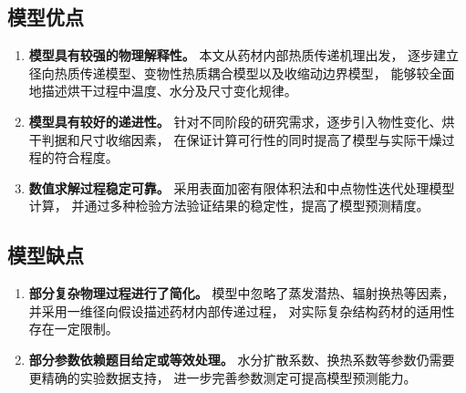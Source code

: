 \subsection{模型优点}

\begin{enumerate}[label=\arabic*、,leftmargin=2em,labelsep=0pt,itemsep=0.5em,topsep=0.3em]
\item \textbf{模型具有较强的物理解释性。}
本文从药材内部热质传递机理出发，
逐步建立径向热质传递模型、变物性热质耦合模型以及收缩动边界模型，
能够较全面地描述烘干过程中温度、水分及尺寸变化规律。

\item \textbf{模型具有较好的递进性。}
针对不同阶段的研究需求，逐步引入物性变化、烘干判据和尺寸收缩因素，
在保证计算可行性的同时提高了模型与实际干燥过程的符合程度。

\item \textbf{数值求解过程稳定可靠。}
采用表面加密有限体积法和中点物性迭代处理模型计算，
并通过多种检验方法验证结果的稳定性，提高了模型预测精度。
\end{enumerate}

\subsection{模型缺点}

\begin{enumerate}[label=\arabic*、,leftmargin=2em,labelsep=0pt,itemsep=0.5em,topsep=0.3em]
\item \textbf{部分复杂物理过程进行了简化。}
模型中忽略了蒸发潜热、辐射换热等因素，
并采用一维径向假设描述药材内部传递过程，
对实际复杂结构药材的适用性存在一定限制。

\item \textbf{部分参数依赖题目给定或等效处理。}
水分扩散系数、换热系数等参数仍需要更精确的实验数据支持，
进一步完善参数测定可提高模型预测能力。
\end{enumerate}

